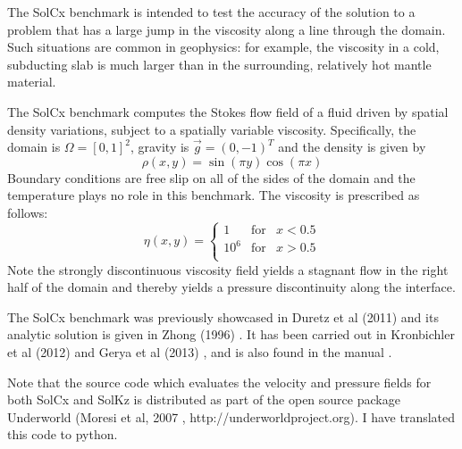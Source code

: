 
The SolCx benchmark is intended to test the accuracy of the solution to a problem that 
has a large jump in the viscosity along a line through the domain. Such situations are 
common in geophysics: for example, the viscosity in a cold, subducting slab is much larger 
than in the surrounding, relatively hot mantle material.

The SolCx benchmark computes the Stokes flow field of a fluid driven by spatial density 
variations, subject to a spatially variable viscosity. Specifically, the domain 
is $\Omega = [0,1]^2$, gravity is $\vec{g} = (0,-1)^T$ and the density is given by 
\begin{equation}
\rho(x,y) = \sin(\pi y) \cos(\pi x)
\end{equation}
Boundary conditions are free slip on all of the sides of the domain and the 
temperature plays no role in this benchmark. 
The viscosity is prescribed as follows:
\begin{equation}
\eta(x,y) = 
\left\{
\begin{array}{lll}
1 & \text{for} & x<0.5 \\
10^6 & \text{for} & x>0.5 \\
\end{array}
\right.
\end{equation}
Note the strongly discontinuous viscosity field yields a stagnant flow 
in the right half of the domain and thereby yields a pressure discontinuity along the interface. 

The SolCx benchmark was previously showcased in Duretz et al (2011) \cite{dumg11} 
and its analytic solution is given in Zhong (1996) \cite{zhon96}. 
It has been carried out in Kronbichler et al (2012) \cite{krhb12} and Gerya et al (2013) \cite{gemd13}, 
and is also found in the \aspect manual \cite{aspectmanual}. 

Note that the source code which evaluates the velocity and pressure fields for both SolCx and SolKz is 
distributed as part of the open source package Underworld 
(Moresi et al, 2007 \cite{moql07}, http://underworldproject.org).
I have translated this code to python. 

